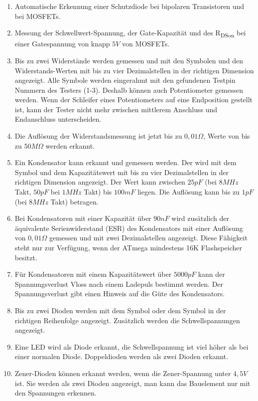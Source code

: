 \begin{enumerate}
\item Automatische Erkennung einer Schutzdiode bei bipolaren Transistoren und bei MOSFETs.
\item Messung der Schwellwert-Spannung, der Gate-Kapazität  und des R\textsubscript{DSon} bei einer Gatespannung von knapp \(5V\) von MOSFETs.
\item Bis zu zwei Widerstände werden gemessen und mit den \mbox{\electricR} Symbolen
und den Widerstands-Werten mit bis zu vier Dezimalstellen in der richtigen Dimension angezeigt.
Alle Symbole werden eingerahmt mit den gefundenen Testpin Nummern des Testers (1-3).
Deshalb können auch Potentiometer gemessen werden. Wenn der Schleifer eines Potentiometers auf eine Endposition
gestellt ist, kann der Tester nicht mehr zwischen mittlerem Anschluss und Endanschluss unterscheiden.
\item Die Auflösung der Widerstandsmessung ist jetzt bis zu \(0,01\Omega\), Werte von bis zu \(50M\Omega\) werden erkannt.
\item Ein Kondensator kann erkannt und gemessen werden. Der wird mit dem Symbol \mbox{\electricC}
und dem Kapazitätswert mit bis zu vier Dezimalstellen in der richtigen Dimension angezeigt.
Der Wert kann zwischen \(25pF\) (bei \(8MHz\) Takt, \(50pF\) bei \(1MHz\) Takt) bis \(100mF\) liegen. Die Auflösung kann bis zu \(1pF\) (bei \(8MHz\) Takt) betragen.
\item Bei Kondensatoren mit einer Kapazität über \(90nF\) wird zusätzlich der äquivalente Serienwiderstand (ESR) des Kondensators
mit einer Auflösung von \(0,01\Omega\) gemessen und mit zwei Dezimalstellen angezeigt.
Diese Fähigkeit steht nur zur Verfügung, wenn der ATmega mindestens 16K Flashspeicher besitzt.
\item Für Kondensatoren mit einem Kapazitätswert über \(5000pF\) kann der Spannungsverlust Vloss nach einem Ladepuls bestimmt werden.
Der Spannungsverlust gibt einen Hinweis auf die Güte des Kondensators.
\item Bis zu zwei Dioden werden mit dem Symbol \mbox{\electricDAK} oder dem Symbol \mbox{\electricDKA}
in der richtigen Reihenfolge angezeigt.
Zusätzlich werden die Schwellspannungen angezeigt.
\item Eine LED wird als Diode erkannt, die Schwellspannung ist viel höher als bei einer normalen Diode.
Doppeldioden werden als zwei Dioden erkannt.
\item Zener-Dioden können erkannt werden, wenn die Zener-Spannung unter \(4,5V\) ist.
Sie werden als zwei Dioden angezeigt, man kann das Bauelement nur mit den Spannungen erkennen.

\end{enumerate}
